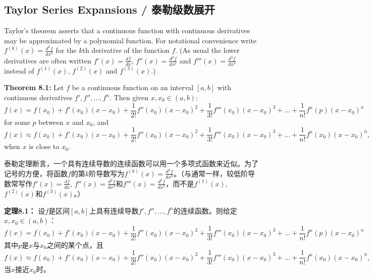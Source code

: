 \subsection{Taylor Series Expansions / 泰勒级数展开}

\begin{original}
Taylor's theorem asserts that a continuous function with continuous derivatives may be approximated by a polynomial function. For notational convenience write $f^{(k)}(x) = \frac{d^k f}{dx^k}$ for the $k$th derivative of the function $f$. (As usual the lower derivatives are often written $f'(x) = \frac{df}{dx}$, $f''(x) = \frac{d^2 f}{dx^2}$ and $f'''(x) = \frac{d^3 f}{dx^3}$ instead of $f^{(1)}(x)$, $f^{(2)}(x)$ and $f^{(3)}(x)$.)

\textbf{Theorem 8.1:} Let $f$ be a continuous function on an interval $[a, b]$ with continuous derivatives $f', f'', \dots, f^n$. Then given $x, x_0 \in (a, b)$:
\[
f(x) = f(x_0) + f'(x_0)(x - x_0) + \frac{1}{2!}f''(x_0)(x - x_0)^2 + \frac{1}{3!}f'''(x_0)(x - x_0)^3 + \dots + \frac{1}{n!}f^n(p)(x - x_0)^n \tag{8.2}
\]
for some $p$ between $x$ and $x_0$, and
\[
f(x) \approx f(x_0) + f'(x_0)(x - x_0) + \frac{1}{2!}f''(x_0)(x - x_0)^2 + \frac{1}{3!}f'''(x_0)(x - x_0)^3 + \dots + \frac{1}{n!}f^n(x_0)(x - x_0)^n, \tag{8.3}
\]
when $x$ is close to $x_0$.
\end{original}
\begin{translation}
泰勒定理断言，一个具有连续导数的连续函数可以用一个多项式函数来近似。为了记号的方便，将函数$f$的第$k$阶导数写为$f^{(k)}(x) = \frac{d^k f}{dx^k}$。（与通常一样，较低阶导数常写作$f'(x) = \frac{df}{dx}$, $f''(x) = \frac{d^2 f}{dx^2}$和$f'''(x) = \frac{d^3 f}{dx^3}$，而不是$f^{(1)}(x)$, $f^{(2)}(x)$和$f^{(3)}(x)$。）

\textbf{定理8.1：} 设$f$是区间$[a, b]$上具有连续导数$f', f'', \dots, f^n$的连续函数。则给定$x, x_0 \in (a, b)$：
\[
f(x) = f(x_0) + f'(x_0)(x - x_0) + \frac{1}{2!}f''(x_0)(x - x_0)^2 + \frac{1}{3!}f'''(x_0)(x - x_0)^3 + \dots + \frac{1}{n!}f^n(p)(x - x_0)^n \tag{8.2}
\]
其中$p$是$x$与$x_0$之间的某个点，且
\[
f(x) \approx f(x_0) + f'(x_0)(x - x_0) + \frac{1}{2!}f''(x_0)(x - x_0)^2 + \frac{1}{3!}f'''(x_0)(x - x_0)^3 + \dots + \frac{1}{n!}f^n(x_0)(x - x_0)^n, \tag{8.3}
\]
当$x$接近$x_0$时。
\end{translation}

